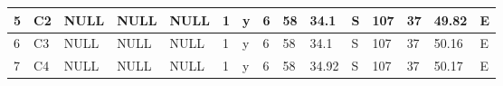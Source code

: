 {\begin{table}[]
\begin{tabular}{|l|l|l|l|l|l|l|l|l|l|l|l|l|l|l|}
		5                                 & C2                                        & NULL                                      & NULL                            & NULL                            & 1                               & y                                    & 6                                                                                    & 58                                                                                   & 34.1                                                                                 & S                                                                                 & 107                                                                                   & 37                                                                                    & 49.82                                                                                 & E                                                                                  \\ \hline
		6                                 & C3                                        & NULL                                      & NULL                            & NULL                            & 1                               & y                                    & 6                                                                                    & 58                                                                                   & 34.1                                                                                 & S                                                                                 & 107                                                                                   & 37                                                                                    & 50.16                                                                                 & E                                                                                  \\ \hline
		7                                 & C4                                        & NULL                                      & NULL                            & NULL                            & 1                               & y                                    & 6                                                                                    & 58                                                                                   & 34.92                                                                                & S                                                                                 & 107                                                                                   & 37                                                                                    & 50.17                                                                                 & E                                                                                  \\ \hline

\end{tabular}
\end{table}}
